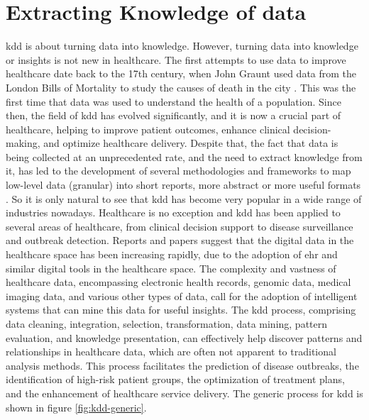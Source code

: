 \section{Extracting Knowledge of data}\label{sec:kdd}

\ac{kdd} is about turning data into knowledge. However, turning data into knowledge or insights is not new in healthcare. The first attempts to use data to improve healthcare date back to the 17th century, when John Graunt used data from the London Bills of Mortality to study the causes of death in the city \cite{741e4dcd-5d3c-325c-9241-5eb5ddd0cb60}. This was the first time that data was used to understand the health of a population. Since then, the field of \ac{kdd} has evolved significantly, and it is now a crucial part of healthcare, helping to improve patient outcomes, enhance clinical decision-making, and optimize healthcare delivery.
Despite that, the fact that data is being collected at an unprecedented rate, and the need to extract knowledge from it, has led to the development of several methodologies and frameworks to map low-level data (granular) into short reports, more abstract or more useful formats \cite{Fayyad_Piatetsky-Shapiro_Smyth_1996}. So it is only natural to see that \ac{kdd} has become very popular in a wide range of industries nowadays.
Healthcare is no exception and \ac{kdd} has been applied to several areas of healthcare, from clinical decision support to disease surveillance and outbreak detection. Reports and papers suggest that \cite{dashBigDataHealthcare2019} the digital data in the healthcare space has been increasing rapidly, due to the adoption of \ac{ehr} and similar digital tools in the healthcare space.  The complexity and vastness of healthcare data, encompassing electronic health records, genomic data, medical imaging data, and various other types of data, call for the adoption of intelligent systems that can mine this data for useful insights. The \ac{kdd} process, comprising data cleaning, integration, selection, transformation, data mining, pattern evaluation, and knowledge presentation, can effectively help discover patterns and relationships in healthcare data, which are often not apparent to traditional analysis methods. This process facilitates the prediction of disease outbreaks, the identification of high-risk patient groups, the optimization of treatment plans, and the enhancement of healthcare service delivery. The generic process for \ac{kdd} is shown in figure \ref{fig:kdd-generic}.

